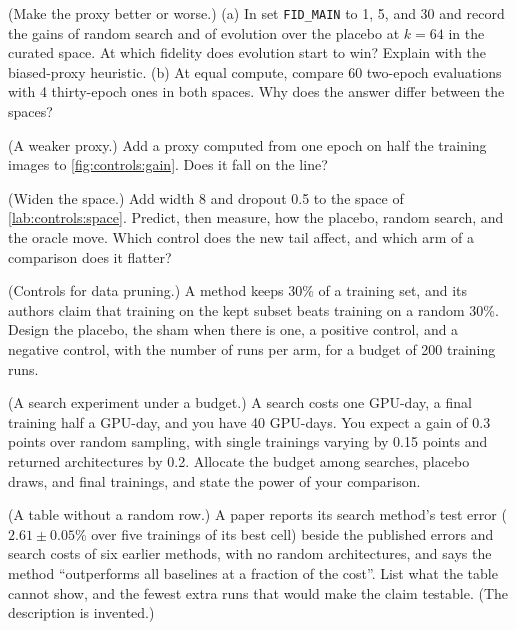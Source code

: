 \begin{refsection}
\begin{exercises}
\item \labwork (Make the proxy better or worse.) (a) In  set \texttt{FID\_MAIN} to 1, 5, and 30 and record the gains of random search and of evolution over the placebo at $k=64$ in the curated space. At which fidelity does evolution start to win? Explain with the biased-proxy heuristic. (b) At equal compute, compare 60 two-epoch evaluations with 4 thirty-epoch ones in both spaces. Why does the answer differ between the spaces?\label{ex:controls:fidelity}

\item \labwork (A weaker proxy.) Add a proxy computed from one epoch on half the training images to \cref{fig:controls:gain}. Does it fall on the line?\label{ex:controls:weaker}

\item \labwork (Widen the space.) Add width 8 and dropout 0.5 to the space of \cref{lab:controls:space}. Predict, then measure, how the placebo, random search, and the oracle move. Which control does the new tail affect, and which arm of a comparison does it flatter?\label{ex:controls:widen}

\item \design (Controls for data pruning.) A method keeps 30\% of a training set, and its authors claim that training on the kept subset beats training on a random 30\%. Design the placebo, the sham when there is one, a positive control, and a negative control, with the number of runs per arm, for a budget of 200 training runs.\label{ex:controls:pruning}

\item \design (A search experiment under a budget.) A search costs one GPU-day, a final training half a GPU-day, and you have 40 GPU-days. You expect a gain of 0.3 points over random sampling, with single trainings varying by 0.15 points and returned architectures by 0.2. Allocate the budget among searches, placebo draws, and final trainings, and state the power of your comparison.\label{ex:controls:budget}

\item \critique (A table without a random row.) A paper reports its search method's test error ($2.61\pm0.05$\% over five trainings of its best cell) beside the published errors and search costs of six earlier methods, with no random architectures, and says the method ``outperforms all baselines at a fraction of the cost''. List what the table cannot show, and the fewest extra runs that would make the claim testable. (The description is invented.)\label{ex:controls:critique1}


\end{exercises}
\end{refsection}
